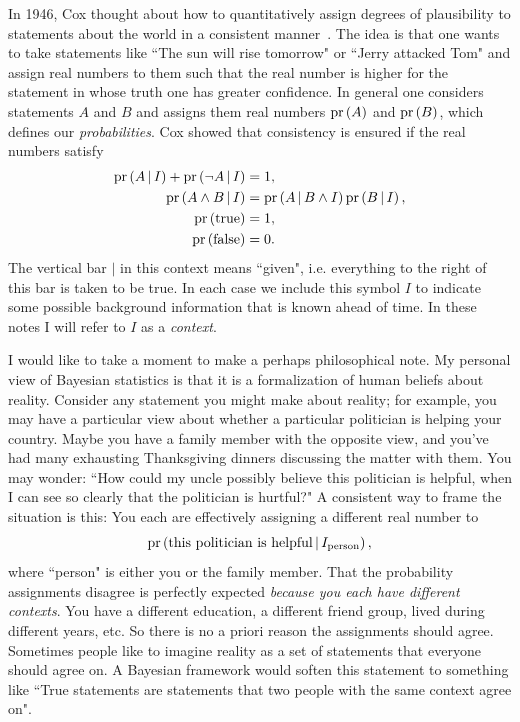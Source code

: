 In 1946, Cox thought about how to quantitatively assign degrees of plausibility to
statements about the world in a consistent manner~\cite{cox_probability_1946}. 
The idea is that one wants to
take statements like ``The sun will rise tomorrow" or ``Jerry attacked Tom" and
assign real numbers to them such that the real number is higher for the
statement in whose truth one has greater confidence.
In general one considers statements $A$ and $B$ and assigns them
real numbers $\pr{A}$ and $\pr{B}$, which defines our 
{\it probabilities}. 
Cox showed that consistency is ensured
if the real numbers satisfy
\begin{equation}\begin{aligned}\label{eq:probabilityAxioms}
\pr{A\given I}+\pr{\neg A\given I}&=1,\\
\pr{A\wedge B\given I}&=\pr{A\given B\wedge I}\pr{B\given I},\\
\pr{\text{true}}&=1,\\
\pr{\text{false}}&=0.
\end{aligned}\end{equation}
The vertical bar $|$ in this context means ``given", i.e. everything to the
right of this bar is taken to be true. In each case we include this symbol $I$
to indicate some possible background information that is known ahead of time.
In these notes I will refer to $I$ as a {\it context}.

I would like to take a moment to make a perhaps philosophical note. My personal
view of Bayesian statistics is that it is a formalization of human beliefs about reality.
Consider any statement you might make about reality; for example, you may have a
particular view about whether a particular politician is helping your country. 
Maybe you have a family member with the opposite view, and you've had many
exhausting Thanksgiving dinners discussing the matter with them. You may wonder:
``How could my uncle possibly believe this politician is helpful, when I can see
so clearly that the politician is hurtful?" A consistent
way to frame the situation is this: You each are effectively assigning a
different real number to
\begin{equation}
\pr{\text{this politician is helpful}\given I_\text{person}},
\end{equation}
where ``person" is either you or the family member. That the probability
assignments disagree is perfectly expected {\it because you each have different
contexts}. You have a different education, a different friend group, lived
during different years, etc. So there is no a priori reason the assignments
should agree. Sometimes people like to imagine reality as a set of
statements that everyone should agree on. A Bayesian framework would soften this
statement to something like ``True statements are statements that two people
with the same context agree on".

